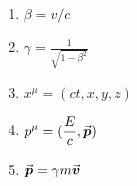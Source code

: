 

\vspace*{\fill}
\centering

\begin{enumerate}
    \item $\displaystyle \beta = v/c$ 
    \item $\displaystyle \gamma = \frac{1}{\sqrt{1 - \beta^2}}$
    \item $\displaystyle x^{\mu} = (ct,x,y,z)$
    \item $\displaystyle p^{\mu} = (\frac{E}{c},\va*{p})$
    \item $\displaystyle \va*{p} = \gamma m \va*{v}$
\end{enumerate}

\centering
\vspace*{\fill}

